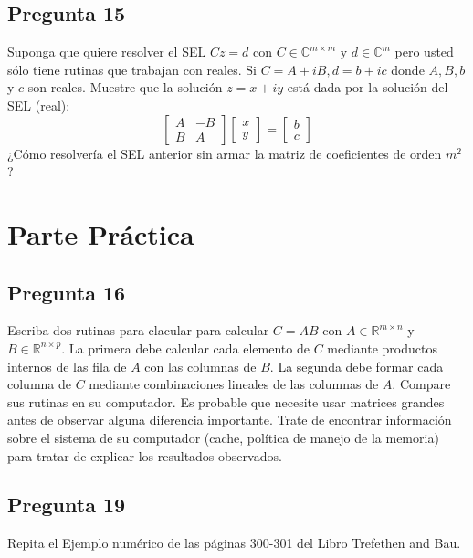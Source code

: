 \documentclass{article}
\def\R{\mbox{\(\mathbb{R}\)}}
\begin{document}
\subsection*{Pregunta 15}
Suponga que quiere resolver el SEL $Cz = d$ con $C\in \mathbb{C}^{m\times m}$ y $d\in \mathbb{C}^{m}$ pero usted sólo tiene rutinas que trabajan con reales. Si $C = A + iB, d = b + ic$ donde $A,B,b$ y $c$ son reales. Muestre que la solución $z = x+iy$ está dada por la solución del SEL (real):
$$
\begin{bmatrix}
A&-B\\
B&A
\end{bmatrix}
\begin{bmatrix}
x\\
y
\end{bmatrix}
=
\begin{bmatrix}
b\\
c
\end{bmatrix}
$$
¿Cómo resolvería el SEL anterior sin armar la matriz de coeficientes de orden $m^{2}$?
\section*{Parte Práctica}
\subsection*{Pregunta 16}
Escriba dos rutinas para clacular para calcular $C=AB$ con $A \in \R^{m\times n}$ y $B\in \R^{n\times p}$. La primera debe calcular cada elemento de $C$ mediante productos internos de las fila de $A$ con las columnas de $B$. La segunda debe formar cada columna de $C$ mediante combinaciones lineales de las columnas de $A$. Compare sus rutinas en su computador. Es probable que necesite usar matrices grandes antes de observar alguna diferencia importante. Trate de encontrar información sobre el sistema de su computador (cache, política de manejo de la memoria) para tratar de explicar los resultados observados.
\subsection*{Pregunta 19}
Repita el Ejemplo numérico de las páginas 300-301 del Libro Trefethen and Bau.
\end{document}
